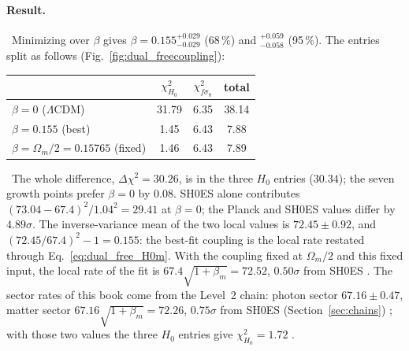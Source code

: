 \paragraph{Result.} \fitted\ Minimizing over $\beta$ gives $\beta=0.155^{+0.029}_{-0.029}$ (68\,\%) and ${}^{+0.059}_{-0.058}$ (95\,\%). The entries
split as follows (Fig.~\ref{fig:dual_freecoupling}):
\begin{center}\small
\begin{tabular}{@{}lccc@{}}\toprule
 & $\chi^2_{H_0}$ & $\chi^2_{f\sigma_8}$ & total\\\midrule
$\beta=0$ ($\Lambda$CDM) & 31.79 & 6.35 & 38.14\\
$\beta=0.155$ (best) & 1.45 & 6.43 & 7.88\\
$\beta=\Omega_m/2=0.15765$ (fixed) & 1.46 & 6.43 & 7.89\\\bottomrule
\end{tabular}
\end{center}
\calc\ The whole difference, $\Delta\chi^2=30.26$, is in the three $H_0$ entries ($30.34$); the seven growth points prefer $\beta=0$ by $0.08$.
SH0ES alone contributes $(73.04-67.4)^2/1.04^2=29.41$ at $\beta=0$; the Planck and SH0ES values differ by $4.89\sigma$. The inverse-variance mean
of the two local values is $72.45\pm0.92$, and $(72.45/67.4)^2-1=0.155$: the best-fit coupling is the local rate restated through
Eq.~\eqref{eq:dual_free_H0m}. With the coupling fixed at $\Omega_m/2$ and this fixed input, the local rate of the fit is $67.4\sqrt{1+\beta_m}=72.52$, $0.50\sigma$
from SH0ES \calc. The sector rates of this book come from the Level~2 chain: photon sector $67.16\pm0.47$, matter sector
$67.16\sqrt{1+\beta_m}=72.26$, $0.75\sigma$ from SH0ES (Section~\ref{sec:chains}) \measured; with those two values the three $H_0$ entries give
$\chi^2_{H_0}=1.72$ \calc.

